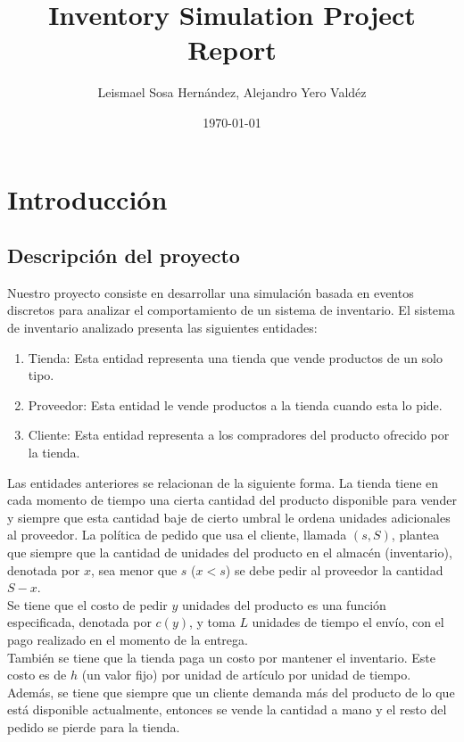 \documentclass{article}
\title{Inventory Simulation Project Report}
\author{Leismael Sosa Hernández, Alejandro Yero Valdéz}
\date{\today}
\begin{document}
\maketitle

\section{Introducción}

\subsection{Descripción del proyecto}

Nuestro proyecto consiste en desarrollar una simulación basada en eventos discretos
para analizar el comportamiento de un sistema de inventario. El sistema de inventario
analizado presenta las siguientes entidades:
\begin{enumerate}
    \item Tienda: Esta entidad representa una tienda que vende productos de un solo tipo.
    \item Proveedor: Esta entidad le vende productos a la tienda cuando esta lo pide.
    \item Cliente: Esta entidad representa a los compradores del producto ofrecido por la tienda.
\end{enumerate}

Las entidades anteriores se relacionan de la siguiente forma.
La tienda tiene en cada momento de tiempo una cierta cantidad del producto disponible para vender y siempre
que esta cantidad baje de cierto umbral le ordena unidades adicionales al proveedor. La política de pedido que usa
el cliente, llamada $(s,S)$, plantea que siempre que la cantidad de unidades del producto en el almacén (inventario), denotada por $x$,
sea menor que $s$ ($x<s$) se debe pedir al proveedor la cantidad $S-x$.\\
Se tiene que el costo de pedir $y$ unidades del producto es una función especificada, denotada por $c(y)$,
y toma $L$ unidades de tiempo el envío, con el pago realizado en el momento de la entrega.\\
También se tiene que la tienda paga un costo por mantener el inventario. Este costo es de $h$ (un valor fijo) por unidad de artículo por unidad de tiempo.
Además, se tiene que siempre que un cliente demanda más del producto de lo que está disponible actualmente, entonces se vende la cantidad a mano y el resto del pedido se pierde para la tienda.
\end{document}
